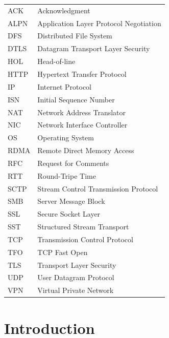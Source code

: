 \documentclass[english, 12pt, a4paper, elec, utf8, a-2b, online]{aaltothesis}
\begin{document}
\newpage


\thesistableofcontents



\begin{tabular}{ll}
ACK & Acknowledgment \\
ALPN & Application Layer Protocol Negotiation \\
DFS & Distributed File System \\
DTLS & Datagram Transport Layer Security \\
HOL & Head-of-line \\
HTTP & Hypertext Transfer Protocol \\
IP & Internet Protocol \\
ISN & Initial Sequence Number \\
NAT & Network Address Translator \\
NIC & Network Interface Controller \\
OS & Operating System \\
RDMA & Remote Direct Memory Access \\
RFC & Request for Comments \\
RTT & Round-Tripe Time \\
SCTP & Stream Control Transmission Protocol \\
SMB & Server Message Block \\
SSL & Secure Socket Layer \\
SST & Structured Stream Transport \\
TCP & Transmission Control Protocol \\
TFO & TCP Fast Open \\
TLS & Transport Layer Security \\
UDP & User Datagram Protocol \\
VPN & Virtual Private Network \\
\end{tabular}


\cleardoublepage

\section{Introduction}
\label{sec:intro}

\thispagestyle{empty}
\end{document}
